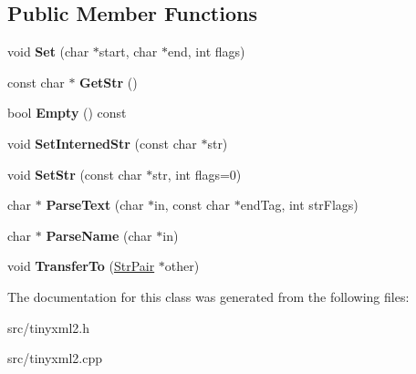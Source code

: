 \subsection*{Public Member Functions}
\begin{DoxyCompactItemize}
\item 
void {\bfseries Set} (char $\ast$start, char $\ast$end, int flags)\hypertarget{classtinyxml2_1_1_str_pair_a4f05549373394266a1eecba26813c166}{}\label{classtinyxml2_1_1_str_pair_a4f05549373394266a1eecba26813c166}

\item 
const char $\ast$ {\bfseries Get\+Str} ()\hypertarget{classtinyxml2_1_1_str_pair_ad87e3d11330f5e689ba1e7e54c023b57}{}\label{classtinyxml2_1_1_str_pair_ad87e3d11330f5e689ba1e7e54c023b57}

\item 
bool {\bfseries Empty} () const \hypertarget{classtinyxml2_1_1_str_pair_affa1043e73a18f05d5d2faec055725a7}{}\label{classtinyxml2_1_1_str_pair_affa1043e73a18f05d5d2faec055725a7}

\item 
void {\bfseries Set\+Interned\+Str} (const char $\ast$str)\hypertarget{classtinyxml2_1_1_str_pair_a2baf6230e18333e02ab65d0897ee3941}{}\label{classtinyxml2_1_1_str_pair_a2baf6230e18333e02ab65d0897ee3941}

\item 
void {\bfseries Set\+Str} (const char $\ast$str, int flags=0)\hypertarget{classtinyxml2_1_1_str_pair_a1f82ec6b5bee35ee7466d8565e43b1de}{}\label{classtinyxml2_1_1_str_pair_a1f82ec6b5bee35ee7466d8565e43b1de}

\item 
char $\ast$ {\bfseries Parse\+Text} (char $\ast$in, const char $\ast$end\+Tag, int str\+Flags)\hypertarget{classtinyxml2_1_1_str_pair_ad90521f188e9606a8fbafe5d86fb2246}{}\label{classtinyxml2_1_1_str_pair_ad90521f188e9606a8fbafe5d86fb2246}

\item 
char $\ast$ {\bfseries Parse\+Name} (char $\ast$in)\hypertarget{classtinyxml2_1_1_str_pair_aa6d8998efceba41d87ec2300c70a6085}{}\label{classtinyxml2_1_1_str_pair_aa6d8998efceba41d87ec2300c70a6085}

\item 
void {\bfseries Transfer\+To} (\hyperlink{classtinyxml2_1_1_str_pair}{Str\+Pair} $\ast$other)\hypertarget{classtinyxml2_1_1_str_pair_a35f795b1557fe5fdcbd93d3cc5d6b939}{}\label{classtinyxml2_1_1_str_pair_a35f795b1557fe5fdcbd93d3cc5d6b939}

\end{DoxyCompactItemize}


The documentation for this class was generated from the following files\+:\begin{DoxyCompactItemize}
\item 
src/tinyxml2.\+h\item 
src/tinyxml2.\+cpp\end{DoxyCompactItemize}
